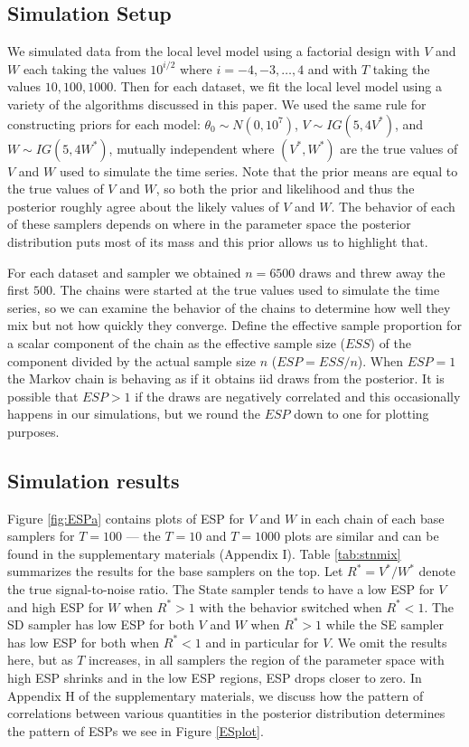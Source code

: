 \documentclass[12pt]{article}
\begin{document}
\subsection{Simulation Setup}

We simulated data from the local level model using a factorial design with $V$ and $W$ each taking the values $10^{i/2}$ where $i=-4,-3,\dots,4$ and with $T$ taking the values $10, 100, 1000$. Then for each dataset, we fit the local level model using a variety of the algorithms discussed in this paper. We used the same rule for constructing priors for each model: $\theta_0\sim N(0,10^7)$, $V\sim IG(5, 4V^*)$, and $W\sim IG(5, 4W^*)$, mutually independent where $(V^*,W^*)$ are the true values of $V$ and $W$ used to simulate the time series. Note that the prior means are equal to the true values of $V$ and $W$, so both the prior and likelihood and thus the posterior roughly agree about the likely values of $V$ and $W$.  The behavior of each of these samplers depends on where in the parameter space the posterior distribution puts most of its mass and this prior allows us to highlight that.

For each dataset and sampler we obtained $n=6500$ draws and threw away the first $500$. The chains were started at the true values used to simulate the time series, so we can examine the behavior of the chains to determine how well they mix but not how quickly they converge. Define the effective sample proportion for a scalar component of the chain as the effective sample size ($ESS$) \citep{gelman2013bayesian} of the component divided by the actual sample size $n$ ($ESP=ESS/n$). When $ESP=1$ the Markov chain is behaving as if it obtains iid draws from the posterior. It is possible that $ESP>1$ if the draws are negatively correlated and this occasionally happens in our simulations, but we round the $ESP$ down to one for plotting purposes.

\subsection{Simulation results}

Figure \ref{fig:ESPa} contains plots of ESP for $V$ and $W$ in each chain of each base samplers for $T=100$ --- the $T=10$ and $T=1000$ plots are similar and can be found in the supplementary materials (Appendix I). Table \ref{tab:stnmix} summarizes the results for the base samplers on the top. Let $R^*=V^*/W^*$ denote the true signal-to-noise ratio. The State sampler tends to have a low ESP for $V$ and high ESP for $W$ when $R^*>1$ with the behavior switched when $R^*<1$. The SD sampler has low ESP for both $V$ and $W$ when $R^*>1$ while the SE sampler has low ESP for both when $R^*<1$ and in particular for $V$. We omit the results here, but as $T$ increases, in all samplers the region of the parameter space with high ESP shrinks and in the low ESP regions, ESP drops closer to zero. In Appendix H of the supplementary materials, we discuss how the pattern of correlations between various quantities in the posterior distribution determines the pattern of ESPs we see in Figure \ref{ESplot}. 
\end{document}
